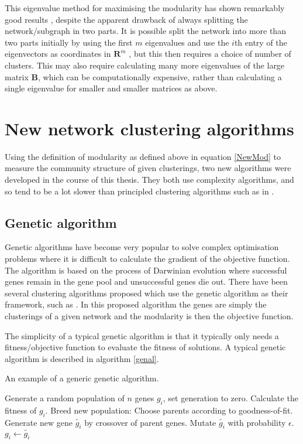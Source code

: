 This eigenvalue method for maximising the modularity has shown
remarkably good results \citep{Newman2006a}, despite the apparent drawback of always splitting the 
network/subgraph in two parts.  It is possible split the network into more than two parts initially by using the first $m$ 
eigenvalues and use the $i$th entry of the eigenvectors as coordinates in 
$\mathbf{R}^{m}$ \citep{Humphries2011a}, but this then requires a choice of 
number of clusters.  This may also 
require calculating many more eigenvalues of the large matrix $\mathbf{B}$, 
which can be computationally expensive, rather than calculating a single eigenvalue for smaller and smaller matrices as above.  


\section{New network clustering algorithms}
Using the definition of modularity as defined above in equation \ref{NewMod} to measure the community structure of given clusterings, two new algorithms were developed in the course of this thesis.  They both use complexity algorithms, and so tend to be a lot slower than principled clustering algorithms such as in \citep{Newman2006a} \citep{NewmanGirvan2004a}.

\subsection{Genetic algorithm}
Genetic algorithms have become very popular to solve complex optimisation problems where it is difficult to calculate the gradient of the objective function.  The algorithm is based on the process of Darwinian evolution where successful genes remain in the gene pool and unsuccessful genes die out.  There have been several clustering algorithms proposed which use the genetic algorithm as their framework, such as \citep{Pizzuti2008a}. In this proposed algorithm the genes are simply the clusterings of a given network and the modularity is then the objective function.

The simplicity of a typical genetic algorithm is that it typically only needs a fitness/objective function to evaluate the fitness of solutions.  A typical genetic algorithm is described in algorithm \ref{genal}.

\begin{algorithm}
\caption{An example of a generic genetic algorithm.}
\label{genal}
\begin{algorithmic}
\STATE Generate a random population of $n$ genes $g_i$, set generation to zero.
\STATE Calculate the fitness of $g_i$.
\ENDFOR
\STATE Breed new population:
\STATE Choose parents according to goodness-of-fit.
\STATE Generate new gene $\tilde{g_i}$ by crossover of parent genes.
\STATE Mutate $\tilde{g_i}$ with probability $\epsilon$.
\ENDFOR
{} \STATE $g_i \leftarrow \tilde{g_i}$ \ENDFOR
\ENDWHILE
\end{algorithmic}
\end{algorithm}

